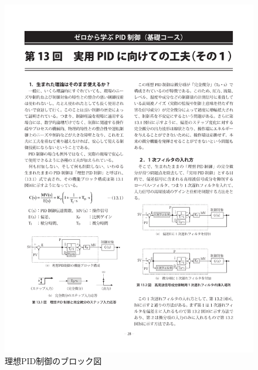 \documentclass[a4j]{ujarticle}
\begin{document}
\begin{figure}[htbp]
  \centering
  \includegraphics[width=0.8\hsize]{pid_ideal_block.pdf}
  \caption{理想PID制御のブロック図}
  \label{pid_ideal_block}
\end{figure}
\end{document}

